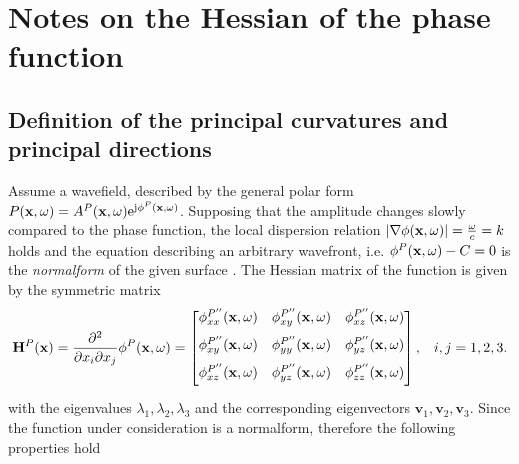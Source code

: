 \section{Notes on the Hessian of the phase function}
\label{App:Hessian}

\subsection{Definition of the principal curvatures and principal directions}
Assume a wavefield, described by the general polar form $P(\mathbf{x},\omega) = A^P(\mathbf{x},\omega)\mathrm{e}^{\mathrm{j} \phi^P (\mathbf{x},\omega)}$.
Supposing that the amplitude changes slowly compared to the phase function, the local dispersion relation $| \nabla \phi(\mathbf{x},\omega) |= \frac{\omega}{c} = k$ holds and the equation describing an arbitrary wavefront, i.e. $\phi^P(\mathbf{x},\omega) - C = 0$ is the \emph{normalform} of the given surface \cite{Hartmann1999, Hartmann2001}.
The Hessian matrix of the function is given by the symmetric matrix
\begin{equation}
\mathbf{H}^P(\mathbf{x}) =
\frac{\partial^2}{\partial x_i \partial x_j} \phi^P(\mathbf{x},\omega) 
=
 \begin{bmatrix} 
\phi^{P''}_{xx}(\mathbf{x},\omega) & \phi^{P''}_{xy}(\mathbf{x},\omega) & \phi^{P''}_{xz}(\mathbf{x},\omega) \\[.7em]
\phi^{P''}_{xy}(\mathbf{x},\omega) & \phi^{P''}_{yy}(\mathbf{x},\omega) & \phi^{P''}_{yz}(\mathbf{x},\omega) \\[.7em]
\phi^{P''}_{xz}(\mathbf{x},\omega) & \phi^{P''}_{yz}(\mathbf{x},\omega) & \phi^{P''}_{zz}(\mathbf{x},\omega) \\[0.5em]    \end{bmatrix}, \hspace{3mm} i,j = 1,2,3.
\end{equation}
with the eigenvalues $\lambda_1, \lambda_2, \lambda_3$ and the corresponding eigenvectors $\mathbf{v}_1, \mathbf{v}_2, \mathbf{v}_3$.
Since the function under consideration is a normalform, therefore the following properties hold
